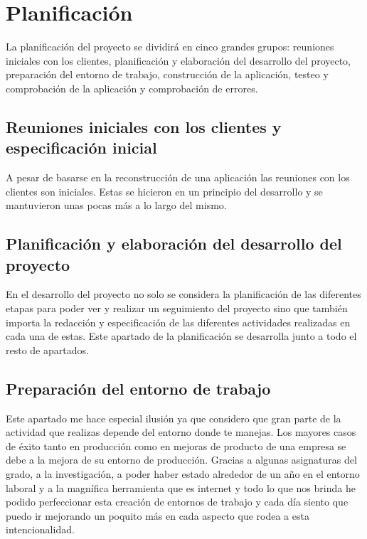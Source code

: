 \section{Planificación}

La planificación del proyecto se dividirá en cinco grandes grupos: reuniones iniciales con los clientes, planificación y elaboración del desarrollo del proyecto, preparación del entorno de trabajo, construcción de la aplicación, testeo y comprobación de la aplicación y comprobación de errores.

\subsection{Reuniones iniciales con los clientes y especificación inicial}

A pesar de basarse en la reconstrucción de una aplicación las reuniones con los clientes son iniciales. Estas se hicieron en un principio del desarrollo y se mantuvieron unas pocas más a lo largo del mismo.

\subsection{Planificación y elaboración del desarrollo del proyecto}

En el desarrollo del proyecto no solo se considera la planificación de las diferentes etapas para poder ver y realizar un seguimiento del proyecto sino que también importa la redacción y especificación de las diferentes actividades realizadas en cada una de estas. Este apartado de la planificación se desarrolla junto a todo el resto de apartados.

\subsection{Preparación del entorno de trabajo}

Este apartado me hace especial ilusión ya que considero que gran parte de la actividad que realizas depende del entorno donde te manejas. Los mayores casos de éxito tanto en producción como en mejoras de producto de una empresa se debe a la mejora de su entorno de producción. Gracias a algunas asignaturas del grado, a la investigación, a poder haber estado alrededor de un año en el entorno laboral y a la magnífica herramienta que es internet y todo lo que nos brinda he podido perfeccionar esta creación de entornos de trabajo y cada día siento que puedo ir mejorando un poquito más en cada aspecto que rodea a esta intencionalidad.


